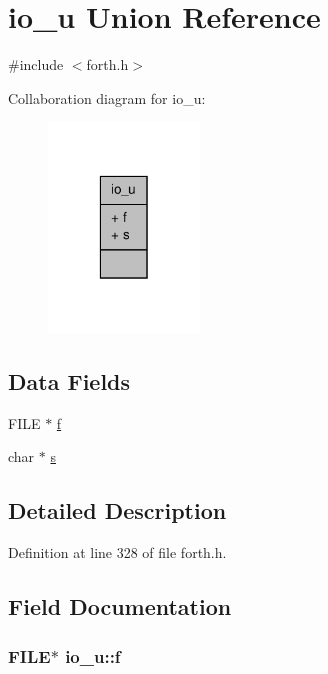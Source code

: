 \hypertarget{unionio__u}{\section{io\-\_\-u Union Reference}
\label{unionio__u}
}


{\ttfamily \#include $<$forth.\-h$>$}



Collaboration diagram for io\-\_\-u\-:
\nopagebreak
\begin{figure}[H]
\begin{center}
\leavevmode
\includegraphics[width=114pt]{unionio__u__coll__graph}
\end{center}
\end{figure}
\subsection*{Data Fields}
\begin{DoxyCompactItemize}
\item 
F\-I\-L\-E $\ast$ \hyperlink{unionio__u_a20295527afdca25a562f0e94b8eb7372}{f}
\item 
char $\ast$ \hyperlink{unionio__u_af2ba735a875960b4c28a64b204f8951d}{s}
\end{DoxyCompactItemize}


\subsection{Detailed Description}


Definition at line 328 of file forth.\-h.



\subsection{Field Documentation}
\hypertarget{unionio__u_a20295527afdca25a562f0e94b8eb7372}{
\subsubsection[{f}]{\setlength{\rightskip}{0pt plus 5cm}F\-I\-L\-E$\ast$ io\-\_\-u\-::f}}\label{unionio__u_a20295527afdca25a562f0e94b8eb7372}


